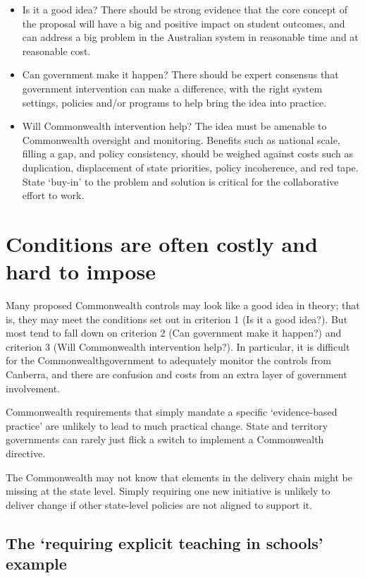 \begin{itemize}
    \item Is it a good idea? There should be strong evidence that the core concept of the proposal will have a big and positive impact on student outcomes, and can address a big problem in the Australian system in reasonable time and at reasonable cost. 
    \item Can government make it happen? There should be expert consensus that government intervention can make a difference, with the right system settings, policies and/or programs to help bring the idea into practice.
    \item Will Commonwealth intervention help? The idea must be amenable to Commonwealth oversight and monitoring. Benefits such as national scale, filling a gap, and policy consistency, should be weighed against costs such as duplication, displacement of state priorities, policy incoherence, and red tape. State `buy-in' to the problem and solution is critical for the collaborative effort to work.   

\end{itemize}



\section{Conditions are often costly and hard to impose}\label{sec:conditions-fall-down}

Many proposed Commonwealth controls may look like a good idea in theory; that is, they may meet the conditions set out in criterion 1 (Is it a good idea?). But most tend to fall down on criterion 2 (Can government make it happen?) and criterion 3 (Will Commonwealth intervention help?). In particular, it is difficult for the Commonwealth\space government to adequately monitor the controls from Canberra, and there are confusion and costs from an extra layer of government involvement. 

Commonwealth requirements that simply mandate a specific `evidence-based practice' are unlikely to lead to much practical change. State and territory governments can rarely just flick a switch to implement a Commonwealth directive.

The Commonwealth may not know that elements in the delivery chain might be missing at the state level. Simply requiring one new initiative is unlikely to deliver change if other state-level policies are not aligned to support it.

\subsection{The `requiring explicit teaching in schools' example}\label{subsec:explicit-teaching}

